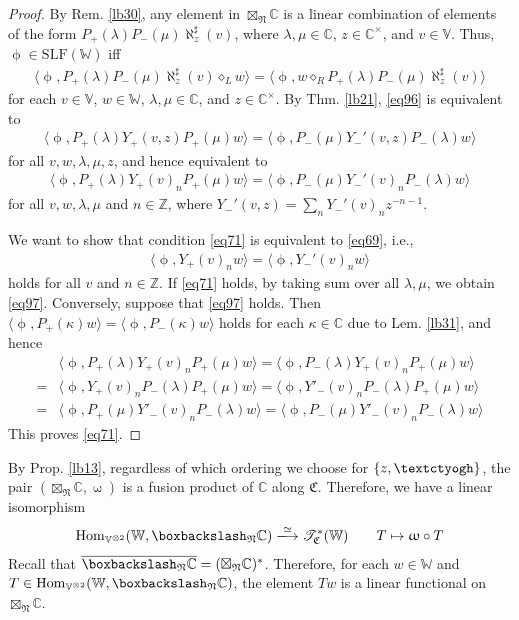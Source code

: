 \documentclass[11pt,b5paper,notitlepage]{article}
\theoremstyle{definition}
\theoremstyle{plain}
\newcommand{\fk}{\mathfrak}
\newcommand{\ovl}{\overline}
\newcommand{\Hom}{\mathrm{Hom}}
\newcommand{\SLF}{\mathrm{SLF}}
\newcommand{\Vbb}{\mathbb V}
\newcommand{\Wbb}{\mathbb W}
\newcommand{\Cbb}{\mathbb C}
\newcommand{\Zbb}{\mathbb Z}
\newcommand{\<}{\left\langle}
\renewcommand{\>}{\right\rangle}
\newcommand{\ST}{\mathscr{T}}
\newcommand{\bk}[1]{\langle {#1}\rangle}
\newcommand{\bbs}{\boxbackslash}
\newcommand{\fn}{\mathfrak{N}}
\newcommand{\tipaz}{\text{\textctyogh}}
\numberwithin{equation}{section}
\begin{document}
\begin{proof}
By Rem. \ref{lb30}, any element in $\boxtimes_\fn\Cbb$ is a linear combination of elements of the form $P_+(\lambda)P_-(\mu)\aleph_z^\sharp(v)$, where $\lambda,\mu \in \Cbb$, $z\in\Cbb^\times$, and $v\in \Vbb$. Thus, $\upphi\in \SLF(\Wbb)$ iff 
\begin{align}\label{eq96}
\bk{\upphi,P_+(\lambda)P_-(\mu)\aleph_z^\sharp(v)\diamond_L w}=\bk{\upphi,w\diamond_R P_+(\lambda)P_-(\mu)\aleph_z^\sharp(v)}
\end{align}
for each $v\in\Vbb$, $w\in\Wbb$, $\lambda,\mu\in\Cbb$, and $z\in\Cbb^\times$. By Thm. \ref{lb21}, \eqref{eq96} is equivalent to 
\begin{align*}
\bk{\upphi,P_+(\lambda)Y_+(v,z)P_+(\mu)w}=\bk{\upphi,P_-(\mu)Y_-'(v,z)P_-(\lambda)w}
\end{align*}
for all $v,w,\lambda,\mu,z$, and hence equivalent to
\begin{align}\label{eq71}
\bk{\upphi,P_+(\lambda)Y_+(v)_nP_+(\mu)w}=\bk{\upphi,P_-(\mu)Y_-'(v)_nP_-(\lambda)w}
\end{align}
for all $v,w,\lambda,\mu$ and $n\in\Zbb$, where $Y_-'(v,z)=\sum_n Y_-'(v)_nz^{-n-1}$. 


We want to show that condition \eqref{eq71} is equivalent to \eqref{eq69}, i.e., 
\begin{align}\label{eq97}
\bk{\upphi,Y_+(v)_nw}=\bk{\upphi,Y_-'(v)_nw}
\end{align}
holds for all $v$ and $n\in\Zbb$. If \eqref{eq71} holds, by taking sum over all $\lambda,\mu$, we obtain \eqref{eq97}. Conversely, suppose that \eqref{eq97} holds. Then $\bk{\upphi,P_+(\kappa)w}=\bk{\upphi,P_-(\kappa)w}$ holds for each $\kappa\in\Cbb$ due to Lem. \ref{lb31}, and hence
\begin{align*}
&\bk{\upphi,P_+(\lambda)Y_+(v)_nP_+(\mu)w}=\bk{\upphi,P_-(\lambda)Y_+(v)_nP_+(\mu)w}\\
=&\bk{\upphi,Y_+(v)_nP_-(\lambda)P_+(\mu)w}=\bk{\upphi,Y'_-(v)_nP_-(\lambda)P_+(\mu)w}\\
=&\bk{\upphi,P_+(\mu)Y'_-(v)_nP_-(\lambda)w}=\bk{\upphi,P_-(\mu)Y'_-(v)_nP_-(\lambda)w}
\end{align*}
This proves \eqref{eq71}.
\end{proof}


By Prop. \ref{lb13}, regardless of which ordering we choose for $\{z,\tipaz\}$, the pair $(\boxtimes_\fn\Cbb,\upomega)$ is a fusion product of $\Cbb$ along $\fk C$. Therefore, we have a linear isomorphism
\begin{gather}\label{eq100}
\Hom_{\Vbb^{\otimes 2}}(\Wbb,\bbs_\fn\Cbb)\xlongrightarrow{\simeq}\ST^*_{\fk C}(\Wbb)\qquad T\mapsto \upomega\circ T
\end{gather}
Recall that $\ovl{\bbs_\fn\Cbb}=(\boxtimes_\fn\Cbb)^*$. Therefore, for each $w\in\Wbb$ and $T\in\Hom_{\Vbb^{\otimes 2}}(\Wbb,\bbs_\fn\Cbb)$, the element $Tw$ is a linear functional on $\boxtimes_\fn\Cbb$.
\end{document}
